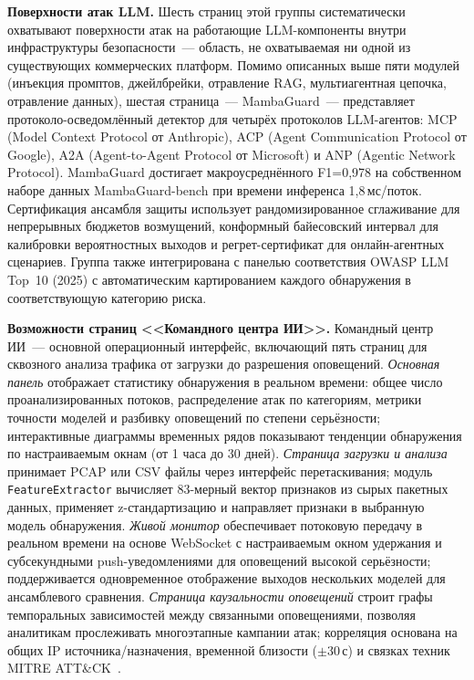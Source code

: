 \noindent\textbf{Поверхности атак LLM.} Шесть страниц этой группы
систематически охватывают поверхности атак на работающие
LLM-компоненты внутри инфраструктуры безопасности~--- область,
не охватываемая ни одной из существующих коммерческих
платформ. Помимо описанных выше пяти модулей (инъекция промптов,
джейлбрейки, отравление RAG, мультиагентная цепочка, отравление
данных), шестая страница~--- \textsf{MambaGuard}~--- представляет
протоколо-осведомлённый детектор для четырёх протоколов
LLM-агентов: MCP (Model Context Protocol от Anthropic), ACP
(Agent Communication Protocol от Google), A2A (Agent-to-Agent
Protocol от Microsoft) и ANP (Agentic Network Protocol).
\textsf{MambaGuard} достигает макроусреднённого F1=0,978 на
собственном наборе данных MambaGuard-bench при времени инференса
1,8\,мс/поток. Сертификация ансамбля защиты использует
рандомизированное сглаживание для непрерывных бюджетов
возмущений, конформный байесовский интервал для калибровки
вероятностных выходов и регрет-сертификат для онлайн-агентных
сценариев. Группа также интегрирована с панелью соответствия
OWASP LLM Top~10 (2025) с автоматическим картированием каждого
обнаружения в соответствующую категорию риска.

\noindent\textbf{Возможности страниц <<Командного центра ИИ>>.}
Командный центр ИИ~--- основной операционный интерфейс, включающий
пять страниц для сквозного анализа трафика от загрузки до
разрешения оповещений. \emph{Основная панель} отображает
статистику обнаружения в реальном времени: общее число
проанализированных потоков, распределение атак по категориям,
метрики точности моделей и разбивку оповещений по степени
серьёзности; интерактивные диаграммы временных рядов показывают
тенденции обнаружения по настраиваемым окнам (от 1 часа до 30
дней). \emph{Страница загрузки и анализа} принимает PCAP или CSV
файлы через интерфейс перетаскивания; модуль
\texttt{FeatureExtractor} вычисляет 83-мерный вектор признаков
из сырых пакетных данных, применяет z-стандартизацию и
направляет признаки в выбранную модель обнаружения. \emph{Живой
монитор} обеспечивает потоковую передачу в реальном времени на
основе WebSocket с настраиваемым окном удержания и
субсекундными push-уведомлениями для оповещений высокой
серьёзности; поддерживается одновременное отображение выходов
нескольких моделей для ансамблевого сравнения. \emph{Страница
каузальности оповещений} строит графы темпоральных зависимостей
между связанными оповещениями, позволяя аналитикам прослеживать
многоэтапные кампании атак; корреляция основана на общих IP
источника/назначения, временной близости ($\pm$30\,с) и связках
техник MITRE ATT\&CK~\cite{Hernandez2015}.

